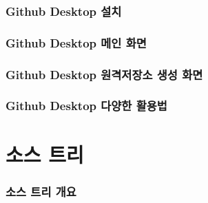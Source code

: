 \documentclass[12pt, a4paper, oneside]{book}
\let\stdsection\section
\renewcommand\section{\newpage\stdsection}
\begin{document}
%										
	\section{Github Desktop 설치}


%										
	\section{Github Desktop 메인 화면}


%										
	\section{Github Desktop 원격저장소 생성 화면}



%										
	\section{Github Desktop 다양한 활용법}



	\part{소스 트리}
	\noptcrule
	\minitoc				


%										
	\section{소스 트리 개요}
\end{document}
